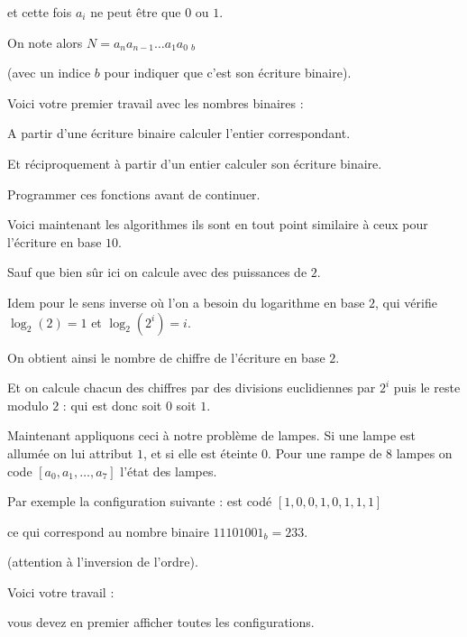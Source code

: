et cette fois $a_i$ ne peut être que $0$ ou $1$.

\change



On note alors $N= a_n a_{n-1}\ldots a_1 a_0 \ _b$ 

(avec un indice $b$ pour indiquer que c'est son écriture binaire).


 

\diapo

Voici votre premier travail avec les nombres binaires :

A partir d'une écriture binaire calculer l'entier correspondant.

Et réciproquement à partir d'un entier calculer son écriture binaire.

Programmer ces fonctions avant de continuer.

\change

Voici maintenant les algorithmes 
ils sont en tout point similaire à ceux pour l'écriture en base $10$.

Sauf que bien sûr ici on calcule avec des puissances de $2$.


\change

Idem pour le sens inverse où l'on a besoin du logarithme en base $2$, qui vérifie
$\log_2(2)=1$ et $\log_2(2^i)=i$.

On obtient ainsi le nombre de chiffre de l'écriture en base $2$.

Et on calcule chacun des chiffres par des divisions euclidiennes par $2^i$ 
puis le reste modulo $2$ : qui est donc soit $0$ soit $1$.


\diapo

Maintenant appliquons ceci à notre problème de lampes.
Si une lampe est allumée on lui attribut $1$, et si elle est éteinte $0$.
Pour une rampe de $8$ lampes on code $[a_0,a_1,\ldots,a_7]$ l'état des lampes.

\change

Par exemple la configuration suivante :
est codé $[1,0,0,1,0,1,1,1]$ 

\change

ce qui correspond au nombre binaire
$11101001_b = 233$.

(attention à l'inversion de l'ordre).

\change

Voici votre travail :

vous devez en premier afficher toutes les  configurations.

